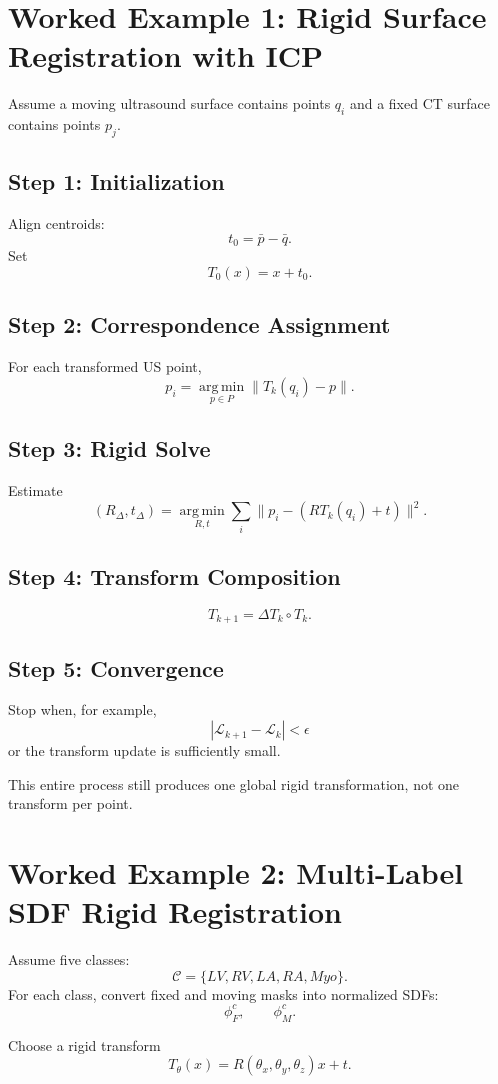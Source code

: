 \documentclass[11pt,a4paper]{article}
\newcommand{\Loss}{\mathcal{L}}
\newcommand{\argmin}{\operatorname*{arg\,min}}
\begin{document}
\section{Worked Example 1: Rigid Surface Registration with ICP}

Assume a moving ultrasound surface contains points $q_i$ and a fixed CT surface contains points $p_j$.

\subsection*{Step 1: Initialization}
Align centroids:
\[
 t_0=\bar p-\bar q.
\]
Set
\[
 T_0(x)=x+t_0.
\]

\subsection*{Step 2: Correspondence Assignment}
For each transformed US point,
\[
 p_i=\argmin_{p\in P}\|T_k(q_i)-p\|.
\]

\subsection*{Step 3: Rigid Solve}
Estimate
\[
(R_{\Delta},t_{\Delta})
=
\argmin_{R,t}\sum_i\|p_i-(RT_k(q_i)+t)\|^2.
\]

\subsection*{Step 4: Transform Composition}
\[
 T_{k+1}=\Delta T_k\circ T_k.
\]

\subsection*{Step 5: Convergence}
Stop when, for example,
\[
|\Loss_{k+1}-\Loss_k|<\epsilon
\]
or the transform update is sufficiently small.

This entire process still produces one global rigid transformation, not one transform per point.

\section{Worked Example 2: Multi-Label SDF Rigid Registration}

Assume five classes:
\[
\mathcal C=\{LV,RV,LA,RA,Myo\}.
\]
For each class, convert fixed and moving masks into normalized SDFs:
\[
\phi_F^c,
\qquad
\phi_M^c.
\]

Choose a rigid transform
\[
T_\theta(x)=R(\theta_x,\theta_y,\theta_z)x+t.
\]
\end{document}

